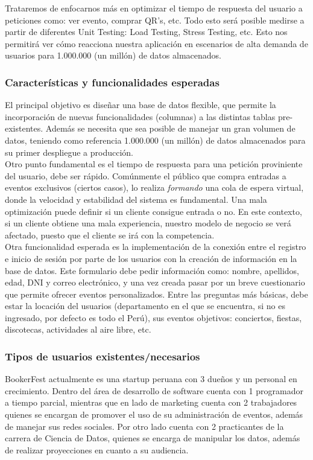 Trataremos de enfocarnos más en optimizar el tiempo de respuesta del usuario a peticiones como: ver evento, comprar QR's, etc. Todo esto será posible medirse a partir de diferentes Unit Testing: Load Testing, Stress Testing, etc. Esto nos permitirá ver cómo reacciona nuestra aplicación en escenarios de alta demanda de usuarios para 1.000.000 (un millón) de datos almacenados.\\

\subsubsection{Características y funcionalidades esperadas}
El principal objetivo es diseñar una base de datos flexible, que permite la incorporación de nuevas funcionalidades (columnas) a las distintas tablas pre-existentes. Además se necesita que sea posible de manejar un gran volumen de datos, teniendo como referencia 1.000.000 (un millón) de datos almacenados para su primer despliegue a producción.\\

Otro punto fundamental es el tiempo de respuesta para una petición proviniente del usuario, debe ser rápido. Comúnmente el público que compra entradas a eventos exclusivos (ciertos casos), lo realiza \textit{formando} una cola de espera virtual, donde la velocidad y estabilidad del sistema es fundamental. Una mala optimización puede definir si un cliente consigue entrada o no. En este contexto, si un cliente obtiene una mala experiencia, nuestro modelo de negocio se verá afectado, puesto que el cliente se irá con la competencia.\\

Otra funcionalidad esperada es la implementación de la conexión entre el registro e inicio de sesión por parte de los usuarios con la creación de información en la base de datos. Este formulario debe pedir información como: nombre, apellidos, edad, DNI y correo electrónico, y una vez creada pasar por un breve cuestionario que permite ofrecer eventos personalizados. Entre las preguntas más básicas, debe estar la locación del usuarios (departamento en el que se encuentra, si no es ingresado, por defecto es todo el Perú), sus eventos objetivos: conciertos, fiestas, discotecas, actividades al aire libre, etc.\\

\subsubsection{Tipos de usuarios existentes/necesarios}
BookerFest actualmente es una startup peruana con 3 dueños y un personal en crecimiento. Dentro del área de desarrollo de software cuenta con 1 programador a tiempo parcial, mientras que en lado de marketing cuenta con 2 trabajadores quienes se encargan de promover el uso de su administración de eventos, además de manejar sus redes sociales. Por otro lado cuenta con 2 practicantes de la carrera de Ciencia de Datos, quienes se encarga de manipular los datos, además de realizar proyecciones en cuanto a su audiencia.\\

